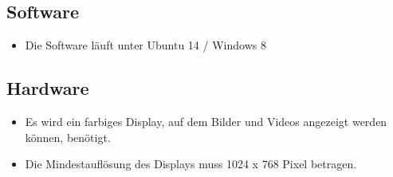 \subsection{Software}
\begin{itemize}
\item Die Software l\"auft unter Ubuntu 14 / Windows 8
\end{itemize}
\subsection{Hardware}
\begin{itemize}
\item Es wird ein farbiges Display, auf dem Bilder und Videos angezeigt werden können, benötigt. 
\item Die Mindestauflösung des Displays muss 1024 x 768 Pixel betragen.
\end{itemize}
